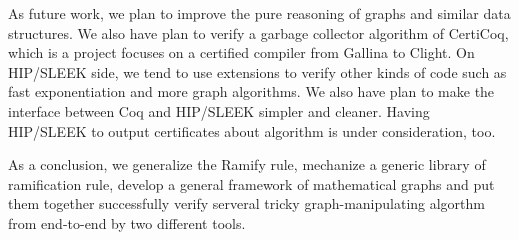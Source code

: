 As future work, we plan to improve the pure reasoning of graphs and
similar data structures. We also have plan to verify a garbage
collector algorithm of CertiCoq, which is a project focuses on a
certified compiler from Gallina to Clight. On HIP/SLEEK side, we tend
to use extensions to verify other kinds of code such as fast
exponentiation and more graph algorithms. We also have plan to make
the interface between Coq and HIP/SLEEK simpler and cleaner. Having
HIP/SLEEK to output certificates about algorithm is under
consideration, too.

As a conclusion, we generalize the Ramify rule, mechanize a generic
library of ramification rule, develop a general framework of
mathematical graphs and put them together successfully verify serveral
tricky graph-manipulating algorthm from end-to-end by two different
tools.
